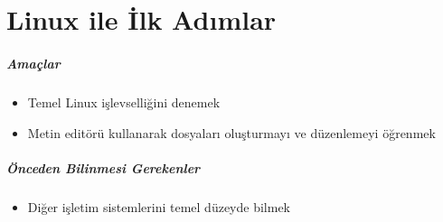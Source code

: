 \chapter{Linux ile İlk Adımlar}
\label{chap:bolum3}
\paragraph{Amaçlar}
\begin{itemize}
 \item Temel Linux işlevselliğini denemek
 \item Metin editörü kullanarak dosyaları oluşturmayı ve düzenlemeyi öğrenmek
 \end{itemize}
 
\paragraph{Önceden Bilinmesi Gerekenler}
\begin{itemize}
 \item Diğer işletim sistemlerini temel düzeyde bilmek
 \end{itemize}

